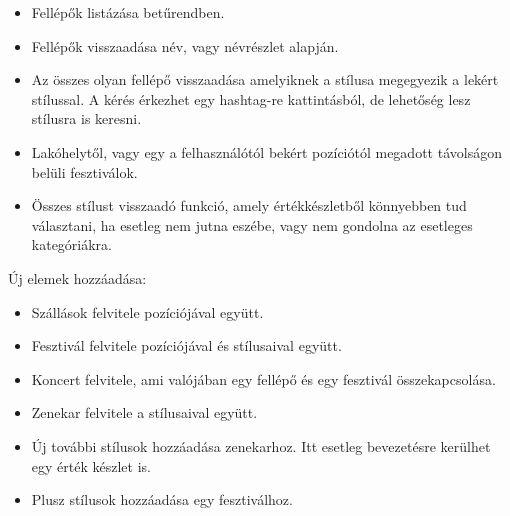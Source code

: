 \begin{itemize}
\item Fellépők listázása betűrendben.
\item Fellépők visszaadása név, vagy névrészlet alapján.
\item Az összes olyan fellépő visszaadása amelyiknek a stílusa megegyezik a lekért stílussal. A kérés érkezhet egy hashtag-re kattintásból, de lehetőség lesz stílusra is keresni.
\item Lakóhelytől, vagy egy a felhasználótól bekért pozíciótól megadott távolságon belüli fesztiválok.
\item Összes stílust visszaadó funkció, amely értékkészletből könnyebben tud választani, ha esetleg nem jutna eszébe, vagy nem gondolna az esetleges kategóriákra.
\end{itemize}

Új elemek hozzáadása:
\begin{itemize}
\item Szállások felvitele pozíciójával együtt.
\item Fesztivál felvitele pozíciójával és stílusaival együtt.
\item Koncert felvitele, ami valójában egy fellépő és egy fesztivál összekapcsolása.
\item Zenekar felvitele a stílusaival együtt.
\item Új további stílusok hozzáadása zenekarhoz. Itt esetleg bevezetésre kerülhet egy érték készlet is.
\item Plusz stílusok hozzáadása egy fesztiválhoz.
\end{itemize}


